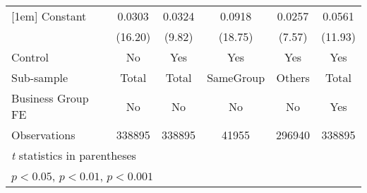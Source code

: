 {\begin{tabular}{l*{5}{c}}
[1em]
Constant            &      0.0303\sym{***}&      0.0324\sym{***}&      0.0918\sym{***}&      0.0257\sym{***}&      0.0561\sym{***}\\
                    &     (16.20)         &      (9.82)         &     (18.75)         &      (7.57)         &     (11.93)         \\
\hline
Control             &          No         &         Yes         &         Yes         &         Yes         &         Yes         \\
Sub-sample          &       Total         &       Total         &   SameGroup         &      Others         &       Total         \\
Business Group FE   &          No         &          No         &          No         &          No         &         Yes         \\
Observations        &      338895         &      338895         &       41955         &      296940         &      338895         \\
\hline\hline
\multicolumn{6}{l}{\footnotesize \textit{t} statistics in parentheses}\\
\multicolumn{6}{l}{\footnotesize \sym{*} \(p<0.05\), \sym{**} \(p<0.01\), \sym{***} \(p<0.001\)}\\
\end{tabular}
}
